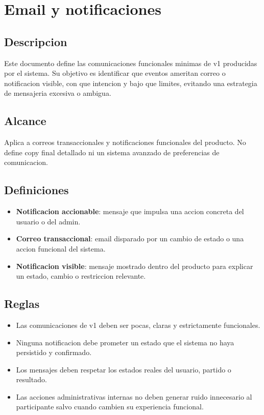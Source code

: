 \section{Email y notificaciones}

\subsection{Descripcion}

Este documento define las comunicaciones funcionales minimas de v1 producidas por el sistema. Su objetivo es identificar que eventos ameritan correo o notificacion visible, con que intencion y bajo que limites, evitando una estrategia de mensajeria excesiva o ambigua.

\subsection{Alcance}

Aplica a correos transaccionales y notificaciones funcionales del producto. No define copy final detallado ni un sistema avanzado de preferencias de comunicacion.

\subsection{Definiciones}

\begin{itemize}
  \item \textbf{Notificacion accionable}: mensaje que impulsa una accion concreta del usuario o del admin.
  \item \textbf{Correo transaccional}: email disparado por un cambio de estado o una accion funcional del sistema.
  \item \textbf{Notificacion visible}: mensaje mostrado dentro del producto para explicar un estado, cambio o restriccion relevante.
\end{itemize}

\subsection{Reglas}

\begin{itemize}
  \item Las comunicaciones de v1 deben ser pocas, claras y estrictamente funcionales.
  \item Ninguna notificacion debe prometer un estado que el sistema no haya persistido y confirmado.
  \item Los mensajes deben respetar los estados reales del usuario, partido o resultado.
  \item Las acciones administrativas internas no deben generar ruido innecesario al participante salvo cuando cambien su experiencia funcional.
\end{itemize}

